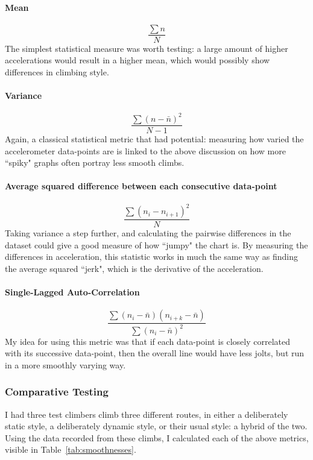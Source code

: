 \paragraph{Mean}
$$\frac{\sum n }{N}$$
The simplest statistical measure was worth testing: a large amount of higher accelerations would result in a higher mean, which would possibly show differences in climbing style.

\paragraph{Variance}
$$\frac{\sum (n - \bar{n} )^2 }{N-1}$$
Again, a classical statistical metric that had potential: measuring how varied the accelerometer data-points are is linked to the above discussion on how more ``spiky" graphs often portray less smooth climbs.

\paragraph{Average squared difference between each consecutive data-point}
$$\frac{\sum (n_i - n_{i+1} )^2 }{N}$$
Taking variance a step further, and calculating the pairwise differences in the dataset could give a good measure of how ``jumpy" the chart is.
By measuring the differences in acceleration, this statistic works in much the same way as finding the average squared ``jerk", which is the derivative of the acceleration.

\paragraph{Single-Lagged Auto-Correlation}
$$
\frac{\sum(n_{i} - \bar{n})(n_{i+k} - \bar{n})}
      {\sum(n_{i} - \bar{n})^{2} }
$$
My idea for using this metric was that if each data-point is closely correlated with its successive data-point, then the overall line would have less jolts, but run in a more smoothly varying way.

\subsubsection {Comparative Testing}
I had three test climbers climb three different routes, in either a deliberately static style, a deliberately dynamic style, or their usual style: a hybrid of the two.
Using the data recorded from these climbs, I calculated each of the above metrics, visible in Table~\ref{tab:smoothnesses}.

